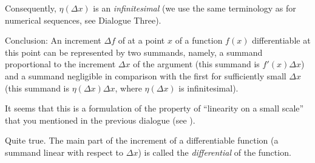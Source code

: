 Consequently, $\eta (\Delta x)$ is an \emph{infinitesimal} (we use the same terminology as for numerical sequences, see Dialogue Three).

\begin{mytheo}{Conclusion:}
An increment $\Delta f$ of at a point $x$ of a function $f (x)$ differentiable at this point can be represented by two summands, namely, a summand proportional to the increment $\Delta x$ of the argument (this summand is $f' (x) \Delta x$) and a summand negligible in comparison with the first for sufficiently small $\Delta x$ (this summand is $\eta (\Delta x) \Delta x$, where  $\eta (\Delta x)$ is infinitesimal).
\end{mytheo}

\rdr It seems that this is a formulation of the property of ``linearity on a small scale'' that you mentioned in the previous dialogue (see ).

\athr Quite true. The main part of the increment of a differentiable function (a summand linear with respect to $\Delta x$) is called the \emph{differential} of the function.
